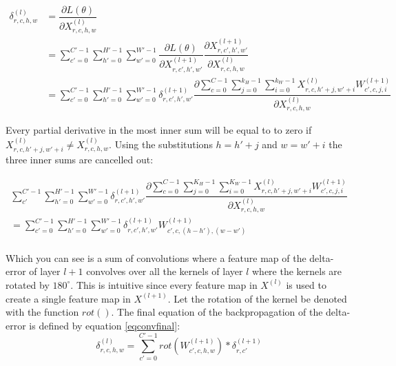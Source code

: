 \documentclass[a4paper,11pt,twoside]{article}
\newcommand*{\pd}[2]{\ensuremath{\dfrac{\partial #1}{\partial #2}}}
\begin{document}
\begin{equation}\label{konvolutionbackprop}
\begin{split}
	\delta^{(l)}_{r,c,h,w}
		& = \pd{L(\theta)}{X^{(l)}_{r,c,h,w}} \\
		& = \sum^{C'-1}_{c'=0} \sum^{H'-1}_{h'=0} \sum^{W'-1}_{w'=0} \pd{L(\theta)}{X^{(l+1)}_{r,c',h',w'}} \pd{X^{(l+1)}_{r,c',h',w'}}{X^{(l)}_{r,c,h,w}} \\
		& = \sum^{C'-1}_{c'=0} \sum^{H'-1}_{h'=0} \sum^{W'-1}_{w'=0} \delta^{(l+1)}_{r,c',h',w'} \pd{\sum^{C-1}_{c=0} \sum^{k_H-1}_{j=0} \sum^{k_W-1}_{i=0} X^{(l)}_{r, c, h'+j, w'+i}W^{(l+1)}_{c', c, j, i}}{X^{(l)}_{r,c,h,w}}
\end{split}
\end{equation}

Every partial derivative in the most inner sum will be equal to to zero if $X^{(l)}_{r, c, h'+j, w'+i} \neq X^{(l)}_{r,c,h,w}$. Using the substitutions $h = h'+j$ and $w = w'+i$ the three inner sums are cancelled out: \cite{webconv1} \cite{webconv2} \cite{webconv3}

\begin{multline}
\sum^{C'-1}_{c'} \sum^{H'-1}_{h'=0} \sum^{W'-1}_{w'=0} \delta^{(l+1)}_{r,c',h',w'} \pd{\sum^{C-1}_{c=0} \sum^{K_H-1}_{j=0} \sum^{K_W-1}_{i=0} X^{(l)}_{r, c, h'+j, w'+i}W^{(l+1)}_{c', c, j, i}}{X^{(l)}_{r,c,h,w}} \\
	 = \sum^{C'-1}_{c'=0} \sum^{H'-1}_{h'=0} \sum^{W'-1}_{w'=0} \delta^{(l+1)}_{r,c',h',w'} W^{(l+1)}_{c', c, (h-h'), (w-w')}     \\
\end{multline}

Which you can see is a sum of convolutions where a feature map of the delta-error of layer $l+1$ convolves over all the kernels of layer $l$ where the kernels are rotated by $180^\circ$. This is intuitive since every feature map in $X^{(l)}$ is used to create a single feature map in $X^{(l+1)}$. Let the rotation of the kernel be denoted with the function $rot()$. The final equation of the backpropagation of the delta-error is defined by equation \eqref{eqconvfinal}: \cite{webconv1} \cite{webconv2} \cite{webconv3}
\begin{equation}\label{eqconvfinal}
\delta^{(l)}_{r,c,h,w} = \sum^{C'-1}_{c'=0} rot(W^{(l+1)}_{c',c,h,w}) * \delta^{(l+1)}_{r,c'}
\end{equation}
\end{document}
